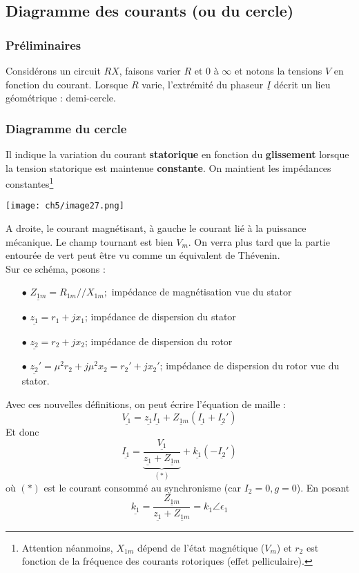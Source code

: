 	\subsection{Diagramme des courants (ou du cercle)}
		\subsubsection{Préliminaires}
		Considérons un circuit $RX$, faisons varier $R$ et 0 à $\infty$ et notons la 
		tensions $V$ en fonction du courant. Lorsque $R$ varie, l'extrémité du phaseur 
		$\underline{I}$ décrit un lieu géométrique : demi-cercle.

		\subsubsection{Diagramme du cercle}
		Il indique la variation du courant \textbf{statorique} en fonction du 
		\textbf{glissement} lorsque la tension statorique est maintenue \textbf{constante}. 
		On maintient les impédances constantes\footnote{Attention néanmoins, $X_{1m}$ dépend 
		de l'état magnétique ($V_m$) et $r_2$ est fonction de la fréquence des courants 
		rotoriques (effet pelliculaire).}

			\begin{center}
		\texttt{[image: ch5/image27.png]}
		\end{center}
		\newpage
		A droite, le courant magnétisant, à gauche le courant lié à la 
		puissance mécanique. Le champ tournant est bien $V_m$. On verra plus tard que la partie 
		entourée de vert peut être vu comme  un équivalent de Thévenin.\\
		Sur ce schéma, posons :
		\begin{itemize}
		\item[$\bullet$] $\underline{Z_{1m}} = R_{1m} // X_{1m} ;$ impédance de magnétisation 
		vue du stator
		\item[$\bullet$] $\underline{z_1} = r_1+jx_1$; impédance de dispersion du stator
		\item[$\bullet$] $\underline{z_2} = r_2+jx_2$; impédance de dispersion du rotor
		\item[$\bullet$] $\underline{z_2}' = \mu^2r_2+j\mu^2x_2 = r_2'+jx_2'$; impédance de 
		dispersion du rotor vue du 	stator.
		\end{itemize}
		Avec ces nouvelles définitions, on peut écrire l'équation de maille :
		\begin{equation}
		\underline{V_1} = \underline{z_1}\underline{I_1} + \underline{Z_{1m}}(\underline{I_1}+
		\underline{I_2}')
		\end{equation}
		Et donc
		\begin{equation}
		\underline{I_1} = \underbrace{\dfrac{\underline{V_1}}{\underline{z_1}+\underline{Z_{1m
		}}}}_{(*)}
		+ \underline{k_1}(-\underline{I_2}')
		\end{equation}
		où $(*)$ est le courant consommé au synchronisme (car $I_2=0, g=0$). En posant 
		\begin{equation}
		\underline{k_1} = \dfrac{\underline{Z_{1m}}}{\underline{z_1}+\underline{Z_{1m}}} = 
		k_1\angle\epsilon_1
		\end{equation}
		
